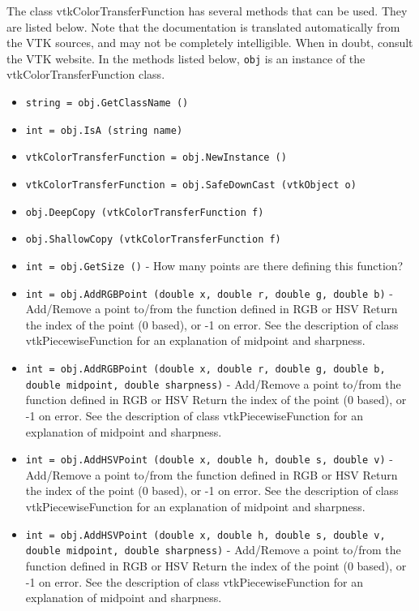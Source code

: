 The class vtkColorTransferFunction has several methods that can be used.
  They are listed below.
Note that the documentation is translated automatically from the VTK sources,
and may not be completely intelligible.  When in doubt, consult the VTK website.
In the methods listed below, \verb|obj| is an instance of the vtkColorTransferFunction class.
\begin{itemize}
\item  \verb|string = obj.GetClassName ()|

\item  \verb|int = obj.IsA (string name)|

\item  \verb|vtkColorTransferFunction = obj.NewInstance ()|

\item  \verb|vtkColorTransferFunction = obj.SafeDownCast (vtkObject o)|

\item  \verb|obj.DeepCopy (vtkColorTransferFunction f)|

\item  \verb|obj.ShallowCopy (vtkColorTransferFunction f)|

\item  \verb|int = obj.GetSize ()| -  How many points are there defining this function?

\item  \verb|int = obj.AddRGBPoint (double x, double r, double g, double b)| -  Add/Remove a point to/from the function defined in RGB or HSV
 Return the index of the point (0 based), or -1 on error.
 See the description of class vtkPiecewiseFunction for an explanation of
 midpoint and sharpness.

\item  \verb|int = obj.AddRGBPoint (double x, double r, double g, double b, double midpoint, double sharpness)| -  Add/Remove a point to/from the function defined in RGB or HSV
 Return the index of the point (0 based), or -1 on error.
 See the description of class vtkPiecewiseFunction for an explanation of
 midpoint and sharpness.

\item  \verb|int = obj.AddHSVPoint (double x, double h, double s, double v)| -  Add/Remove a point to/from the function defined in RGB or HSV
 Return the index of the point (0 based), or -1 on error.
 See the description of class vtkPiecewiseFunction for an explanation of
 midpoint and sharpness.

\item  \verb|int = obj.AddHSVPoint (double x, double h, double s, double v, double midpoint, double sharpness)| -  Add/Remove a point to/from the function defined in RGB or HSV
 Return the index of the point (0 based), or -1 on error.
 See the description of class vtkPiecewiseFunction for an explanation of
 midpoint and sharpness.


\end{itemize}
